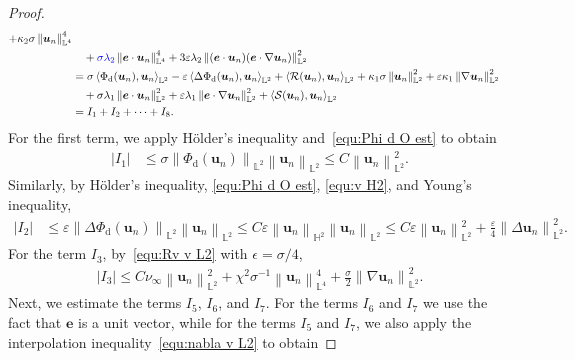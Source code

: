 \documentclass[11pt, reqno]{amsart}
\theoremstyle{definition}
\numberwithin{equation}{section}
\newcommand{\bff}{\boldsymbol}
\newcommand{\bb}{\mathbb}
\newcommand{\bl}[1]{{\color{blue}{#1}}}
\newcommand{\norm}[2]{\left\|{#1}\right\|_{#2}}
\newcommand{\inpro}[2]{\left\langle#1,#2\right\rangle}
\newcommand{\abs}[1]{\left|{#1}\right|}
\begin{document}
\begin{proof}
\begin{align}
		+
		\kappa_2 \sigma\norm{\bff{u}_n}{\bb{L}^4}^4
        \nonumber\\
        &\quad
        +
        \bl{\sigma\lambda_2} \norm{\bff{e}\cdot\bff{u}_n}{\bb{L}^4}^4
        +
        3\varepsilon\lambda_2 \norm{(\bff{e}\cdot \bff{u}_n)(\bff{e}\cdot \nabla \bff{u}_n)}{\bb{L}^2}^2
		\nonumber\\
		&
		=
		\sigma\inpro{\Phi_{\mathrm{d}}(\bff{u}_n)}{\bff{u}_n}_{\bb{L}^2}
		-
		\varepsilon \inpro{\Delta \Phi_{\mathrm{d}}(\bff{u}_n)}{\bff{u}_n}_{\bb{L}^2}
		+
		\inpro{\mathcal{R}(\bff{u}_n)}{\bff{u}_n}_{\bb{L}^2}
		+
		\kappa_1 \sigma \norm{\bff{u}_n}{\bb{L}^2}^2
		+
		\varepsilon \kappa_1 \norm{\nabla \bff{u}_n}{\bb{L}^2}^2
        \nonumber \\
        &\quad
        +
        \sigma\lambda_1 \norm{\bff{e}\cdot \bff{u}_n}{\bb{L}^2}^2
        +
        \varepsilon\lambda_1 \norm{\bff{e}\cdot\nabla \bff{u}_n}{\bb{L}^2}^2
        +
        \inpro{\mathcal{S}(\bff{u}_n)}{\bff{u}_n}_{\bb{L}^2}
        \nonumber\\
        &=
        I_1+I_2+\cdots+I_{8}.
	\end{align}
	For the first term, we apply H\"older's inequality and~\eqref{equ:Phi d O est} to obtain
	\begin{align}
		\label{equ:I1 un}
		\abs{I_1}
		&\leq 
		\sigma \norm{\Phi_{\mathrm{d}}(\bff{u}_n)}{\bb{L}^2} \norm{\bff{u}_n}{\bb{L}^2} 
		\leq
		C \norm{\bff{u}_n}{\bb{L}^2}^2.
	\end{align}
    Similarly, by H\"older's inequality, \eqref{equ:Phi d O est}, \eqref{equ:v H2}, and Young's inequality,
    \begin{align}\label{equ:I2 un}
		\abs{I_2}
		&\leq
		\varepsilon \norm{\Delta \Phi_{\mathrm{d}}(\bff{u}_n)}{\bb{L}^2} \norm{\bff{u}_n}{\bb{L}^2} 
        \leq
        C\varepsilon\norm{\bff{u}_n}{\bb{H}^2} \norm{\bff{u}_n}{\bb{L}^2}
		\leq
		C\varepsilon \norm{\bff{u}_n}{\bb{L}^2}^2
		+
		\frac{\varepsilon}{4} \norm{\Delta \bff{u}_n}{\bb{L}^2}^2.
	\end{align}
	For the term $I_3$, by~\eqref{equ:Rv v L2} with $\epsilon=\sigma/4$,
	\begin{align}
		\label{equ:I3 un}
		\abs{I_3}
		\leq
		C\nu_\infty \norm{\bff{u}_n}{\bb{L}^2}^2
		+
        \chi^2 \sigma^{-1} \norm{\bff{u}_n}{\bb{L}^4}^4
        +
		\frac{\sigma}{2} \norm{\nabla \bff{u}_n}{\bb{L}^2}^2.
	\end{align}
	Next, we estimate the terms $I_5$, $I_6$, and $I_7$. For the terms $I_6$ and $I_7$ we use the fact that $\bff{e}$ is a unit vector, while for the terms $I_5$ and $I_7$, we also apply the interpolation inequality~\eqref{equ:nabla v L2} to obtain

\end{proof}
\end{document}
